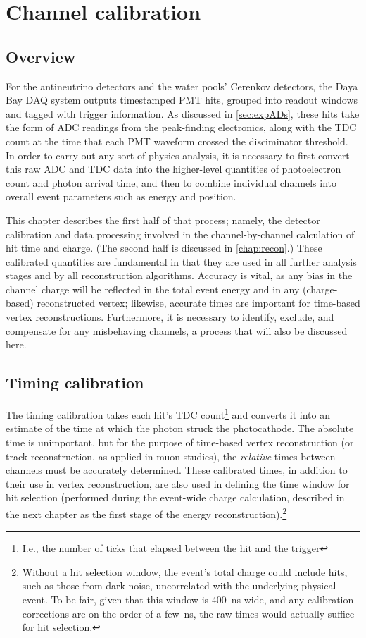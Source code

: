 \documentclass[../thesis.tex]{subfiles}
\begin{document}
\chapter{Channel calibration}
\label{chap:calib}

\section{Overview}

For the antineutrino detectors and the water pools' Cerenkov detectors, the Daya Bay DAQ system outputs timestamped PMT hits, grouped into readout windows and tagged with trigger information. As discussed in \autoref{sec:expADs}, these hits take the form of ADC readings from the peak-finding electronics, along with the TDC count at the time that each PMT waveform crossed the disciminator threshold. In order to carry out any sort of physics analysis, it is necessary to first convert this raw ADC and TDC data into the higher-level quantities of photoelectron count and photon arrival time, and then to combine individual channels into overall event parameters such as energy and position.

This chapter describes the first half of that process; namely, the detector calibration and data processing involved in the channel-by-channel calculation of hit time and charge. (The second half is discussed in \autoref{chap:recon}.) These calibrated quantities are fundamental in that they are used in all further analysis stages and by all reconstruction algorithms. Accuracy is vital, as any bias in the channel charge will be reflected in the total event energy and in any (charge-based) reconstructed vertex; likewise, accurate times are important for time-based vertex reconstructions. Furthermore, it is necessary to identify, exclude, and compensate for any misbehaving channels, a process that will also be discussed here.

\section{Timing calibration}
\label{sec:calibTiming}

The timing calibration takes each hit's TDC count\footnote{I.e., the number of ticks that elapsed between the hit and the trigger} and converts it into an estimate of the time at which the photon struck the photocathode. The absolute time is unimportant, but for the purpose of time-based vertex reconstruction (or track reconstruction, as applied in muon studies), the \emph{relative} times between channels must be accurately determined. These calibrated times, in addition to their use in vertex reconstruction, are also used in defining the time window for hit selection (performed during the event-wide charge calculation, described in the next chapter as the first stage of the energy reconstruction).\footnote{Without a hit selection window, the event's total charge could include hits, such as those from dark noise, uncorrelated with the underlying physical event. To be fair, given that this window is 400~ns wide, and any calibration corrections are on the order of a few~ns, the raw times would actually suffice for hit selection.}
\end{document}
